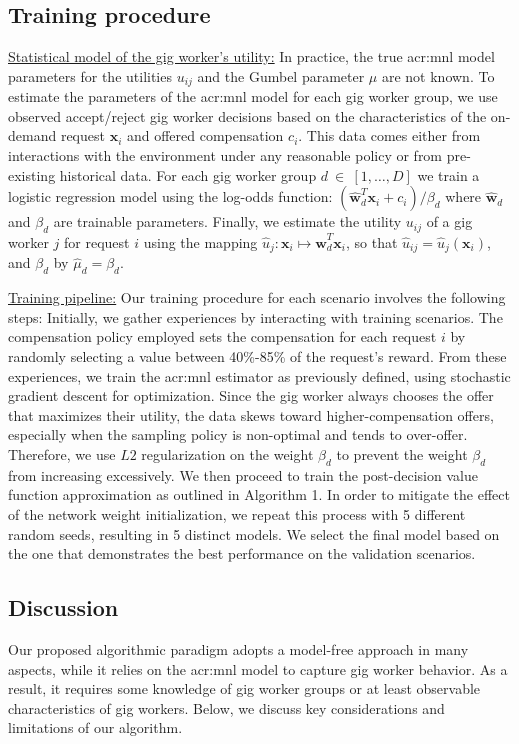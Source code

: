 \subsection{Training procedure}
\label{sec:training}
\noindent \underline{Statistical model of the gig worker's utility:} In practice, the true \gls{acr:mnl} model parameters for the utilities $u_{ij}$ and the Gumbel parameter $\mu$ are not known. To estimate the parameters of the \gls{acr:mnl} model for each gig worker group, we use observed accept/reject gig worker decisions based on the characteristics of the on-demand request $\mathbf{x}_i$ and offered compensation $c_i$. This data comes either from interactions with the environment under any reasonable policy or from pre-existing historical data. For each gig worker group $d~\in~[1,\dots,D]$ we train a logistic regression model using the log-odds function: $(\mathbf{\hat{w}}_d^T\mathbf{x}_i + c_i)/\beta_d$ where $\mathbf{\hat{w}}_d$ and $\beta_d$ are trainable parameters. Finally, we estimate the utility $u_{ij}$ of a gig worker $j$ for request $i$ using the mapping $\hat{\mathit{u}}_j : \mathbf{x}_i \mapsto \mathbf{\hat{w}}_d^T \mathbf{x}_i$, so that $\hat{u}_{ij} = \hat{\mathit{u}}_j(\mathbf{x}_i)$, and $\beta_d$ by $\hat{\mu}_d = \beta_d$.

\noindent \underline{Training pipeline:} Our training procedure for each scenario involves the following steps: Initially, we gather experiences by interacting with training scenarios. The compensation policy employed sets the compensation for each request $i$  by randomly selecting a value between 40\%-85\% of the request's reward. From these experiences, we train the \gls{acr:mnl} estimator as previously defined, using stochastic gradient descent for optimization. Since the gig worker always chooses the offer that maximizes their utility, the data skews toward higher-compensation offers, especially when the sampling policy is non-optimal and tends to over-offer. Therefore, we use \(L2\) regularization on the weight $\beta_d$ to prevent the weight $\beta_d$ from increasing excessively. We then proceed to train the post-decision value function approximation as outlined in Algorithm 1. In order to mitigate the effect of the network weight initialization, we repeat this process with 5 different random seeds, resulting in 5 distinct models. We select the final model based on the one that demonstrates the best performance on the validation scenarios.

\subsection{Discussion}
\label{sec:meth_as}
Our proposed algorithmic paradigm adopts a model-free approach in many aspects, while it relies on the \gls{acr:mnl} model to capture gig worker behavior. As a result, it requires some knowledge of gig worker groups or at least observable characteristics of gig workers. Below, we discuss key considerations and limitations of our algorithm.

